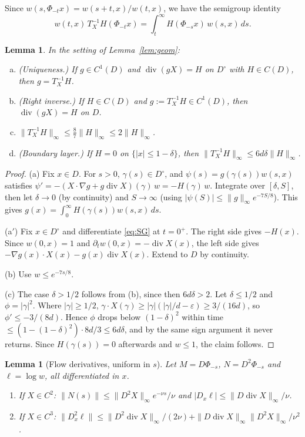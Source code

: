 \documentclass[11pt]{article}
\newtheorem{lemma}[theorem]{Lemma}
\theoremstyle{definition}
\theoremstyle{remark}
\newcommand{\dv}{\operatorname{div}}
\newcommand{\Dint}{D^{\circ}}
\begin{document}
Since $w(s,\Phi_{-t}x)=w(s+t,x)/w(t,x)$, we have the semigroup identity
\begin{equation}\label{eq:SG}
w(t,x)\,T^{-1}_XH(\Phi_{-t}x)=\int_t^\infty H(\Phi_{-s}x)\,w(s,x)\,ds .
\end{equation}

\begin{lemma}\label{lem:T}
In the setting of Lemma~\ref{lem:geom}:
\begin{enumerate}[(a)]
\item[\textup{(a)}] \textup{(Uniqueness.)} If $g\in C^1(D)$ and $\dv(gX)=H$ on $\Dint$ with $H\in C(D)$, then $g=T^{-1}_XH$.
\item[\textup{(a$'$)}] \textup{(Right inverse.)} If $H\in C(D)$ and $g:=T^{-1}_XH\in C^1(D)$, then $\dv(gX)=H$ on $D$.
\item[\textup{(b)}] $\|T^{-1}_XH\|_\infty\le\frac87\|H\|_\infty\le2\|H\|_\infty$.
\item[\textup{(c)}] \textup{(Boundary layer.)} If $H=0$ on $\{|x|\le1-\delta\}$, then $\|T^{-1}_XH\|_\infty\le6d\delta\|H\|_\infty$.
\end{enumerate}
\end{lemma}

\begin{proof}
(a) Fix $x\in D$. For $s>0$, $\gamma(s)\in\Dint$, and $\psi(s)=g(\gamma(s))w(s,x)$ satisfies
$\psi'=-(X\cdot\nabla g+g\dv X)(\gamma)\,w=-H(\gamma)\,w$.
Integrate over $[\delta,S]$, then let $\delta\to0$ (by continuity) and $S\to\infty$ (using $|\psi(S)|\le\|g\|_\infty e^{-7S/8}$). This gives $g(x)=\int_0^\infty H(\gamma(s))w(s,x)\,ds$.

(a$'$) Fix $x\in\Dint$ and differentiate \eqref{eq:SG} at $t=0^+$. The right side gives $-H(x)$. Since $w(0,x)=1$ and $\partial_tw(0,x)=-\dv X(x)$, the left side gives $-\nabla g(x)\cdot X(x)-g(x)\dv X(x)$. Extend to $D$ by continuity.

(b) Use $w\le e^{-7s/8}$.

(c) The case $\delta>1/2$ follows from (b), since then $6d\delta>2$. Let $\delta\le1/2$ and $\phi=|\gamma|^2$. Where $|\gamma|\ge1/2$, $\gamma\cdot X(\gamma)\ge|\gamma|(|\gamma|/d-\varepsilon)\ge3/(16d)$, so $\phi'\le-3/(8d)$. Hence $\phi$ drops below $(1-\delta)^2$ within time $\le(1-(1-\delta)^2)\cdot8d/3\le6d\delta$, and by the same sign argument it never returns. Since $H(\gamma(s))=0$ afterwards and $w\le1$, the claim follows.
\end{proof}

\begin{lemma}[Flow derivatives, uniform in $s$]\label{lem:flowder}
Let $M=D\Phi_{-s}$, $N=D^2\Phi_{-s}$ and $\ell=\log w$, all differentiated in $x$.
\begin{enumerate}[(1)]
\item If $X\in C^2$: $\|N(s)\|\le\|D^2X\|_\infty e^{-\nu s}/\nu$ and $|D_x\ell|\le\|D\dv X\|_\infty/\nu$.
\item If $X\in C^3$: $\|D_x^2\ell\|\le\|D^2\dv X\|_\infty/(2\nu)+\|D\dv X\|_\infty\|D^2X\|_\infty/\nu^2$.
\end{enumerate}
\end{lemma}
\end{document}
